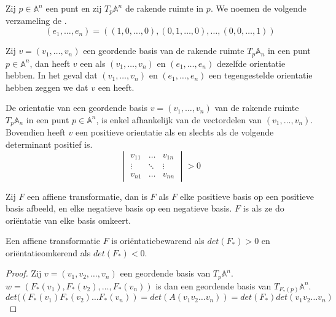 \documentclass[main.tex]{subfiles}
\begin{document}
\begin{de}
  Zij $p\in \mathbb{A}^{n}$ een punt en zij $T_{p}\mathbb{A}^{n}$ de rakende ruimte in $p$.
  We noemen de volgende verzameling de .
  \[
  (e_{1},\dotsc, e_{n}) =
  (
    (1,0,\dotsc,0),
    (0,1,\dotsc,0),
    \dotsc,
    (0,0,\dotsc,1)
    )
  \]
\end{de}

\begin{de}
  Zij $v = (v_{1},\dotsc,v_{n})$ een geordende basis van de rakende ruimte $T_{p}\mathbb{A}_{n}$ in een punt $p\in \mathbb{A}^{n}$, dan heeft $v$ een  als $(v_{1},\dotsc,v_{n})$ en $(e_{1},\dotsc, e_{n})$ dezelfde orientatie hebben. In het geval dat $(v_{1},\dotsc,v_{n})$ en $(e_{1},\dotsc, e_{n})$ een tegengestelde orientatie hebben zeggen we dat $v$ een  heeft.
\end{de}

\begin{st}
  De orientatie van een geordende basis $v = (v_{1},\dotsc,v_{n})$ van de rakende ruimte $T_{p}\mathbb{A}_{n}$ in een punt $p\in \mathbb{A}^{n}$, is enkel afhankelijk van de vectordelen van $(v_{1},\dotsc,v_{n})$.
  Bovendien heeft $v$ een positieve orientatie als en slechts als de volgende determinant positief is.
  \[ 
  \begin{vmatrix}
    v_{11} & \hdots & v_{1n} \\
    \vdots & \ddots & \vdots \\
    v_{n1} & \hdots & v_{nn}
  \end{vmatrix}
  > 0
  \]
\end{st}

\begin{de}
  Zij $F$ een affiene transformatie, dan is $F$  als $F$ elke positieve basis op een positieve basis afbeeld, en elke negatieve basis op een negatieve basis.
  $F$ is  als ze do ori\"entatie van elke basis omkeert.
\end{de}

\begin{st}
  Een affiene transformatie $F$ is ori\"entatiebewarend als $det(F_{*}) > 0$ en ori\"entatieomkerend als $det(F_{*}) < 0$.

  \begin{proof}
     Zij $v=(v_{1},v_{2},\dotsc,v_{n})$ een geordende basis van $T_{p}\mathbb{A}^{n}$.
     $w = (F_{*}(v_{1}),F_{*}(v_{2}),\dotsc,F_{*}(v_{n}))$ is dan een geordende basis van $T_{F_{*}(p)}\mathbb{A}^{n}$.
     \[ det((F_{*}(v_{1})F_{*}(v_{2})\dotsc F_{*}(v_{n})) = det(A(v_{1} v_{2} \dotsc v_{n})) = det(F_{*})det(v_{1} v_{2} \dotsc v_{n}) \]
  \end{proof}
\end{st}
\end{document}
